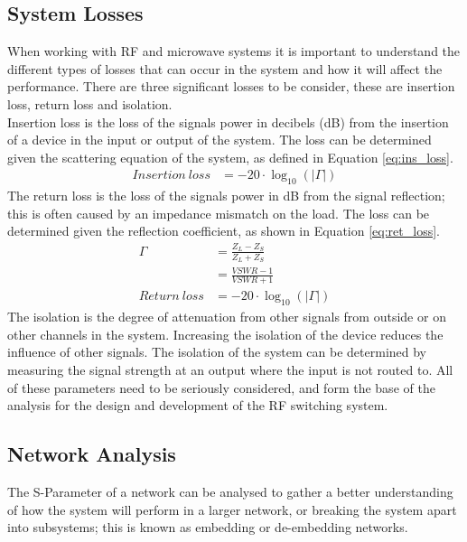\documentclass[12pt,openany,a4paper]{book}
\begin{document}
\subsection{System Losses}
When working with RF and microwave systems it is important to understand the different types of losses that can occur in the system and how it will affect the performance. There are three significant losses to be consider, these are insertion loss, return loss and isolation.\\
Insertion loss is the loss of the signals power in decibels (dB) from the insertion of a device in the input or output of the system. The loss can be determined given the scattering equation of the system, as defined in Equation \ref{eq:ins_loss}.
\begin{align}
Insertion \ loss &= -20\cdot \log_{10}\left( |\Gamma | \right) \label{eq:ins_loss}
\end{align}
The return loss is the loss of the signals power in dB from the signal reflection; this is often caused by an impedance mismatch on the load. The loss can be determined given the reflection coefficient, as shown in Equation \ref{eq:ret_loss}.
\begin{align}
\Gamma &= \frac{Z_L-Z_S}{Z_L+Z_S} \label{eq:ref} \\
&= \frac{VSWR-1}{VSWR+1} \nonumber \\
Return \ loss &= -20\cdot \log_{10}\left( |\Gamma | \right) \label{eq:ret_loss}
\end{align}
The isolation is the degree of attenuation from other signals from outside or on other channels in the system. Increasing the isolation of the device reduces the influence of other signals. The isolation of the system can be determined by measuring the signal strength at an output where the input is not routed to. \cite{ref9} All of these parameters need to be seriously considered, and form the base of the analysis for the design and development of the RF switching system.

\subsection{Network Analysis}
The S-Parameter of a network can be analysed to gather a better understanding of how the system will perform in a larger network, or breaking the system apart into subsystems; this is known as embedding or de-embedding networks.
\end{document}
